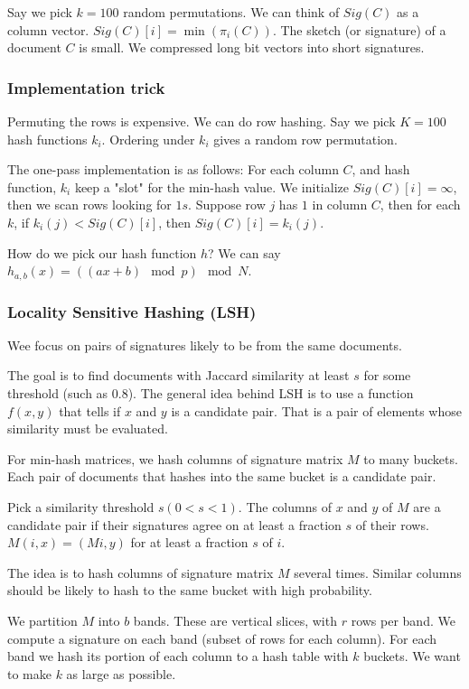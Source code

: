     Say we pick $k = 100$ random permutations. We can think of $Sig(C)$ as a column vector. $Sig(C)[i] = \min(\pi_i(C))$. The sketch (or signature) of a document $C$ is small. We compressed long bit vectors into short signatures. 
    
    \subsubsection{Implementation trick}
        Permuting the rows is expensive. We can do row hashing. Say we pick $K = 100$ hash functions $k_i$. Ordering under $k_i$ gives a random row permutation. 
        
        The one-pass implementation is as follows: For each column $C$, and hash function, $k_i$ keep a "slot" for the min-hash value. We initialize $Sig(C)[i] = \infty$, then we scan rows looking for $1s$. Suppose row $j$ has $1$ in column $C$, then for each $k$, if $k_i(j) < Sig(C)[i]$, then $Sig(C)[i] = k_i(j)$. 
        
        How do we pick our hash function $h$? We can say $h_{a,b}(x) = ((ax+b) \mod p) \mod N$.
    
    \subsubsection{Locality Sensitive Hashing (LSH)}
        Wee focus on pairs of signatures likely to be from the same documents. 
        
        The goal is to find documents with Jaccard similarity at least $s$ for some threshold (such as $0.8$). The general idea behind LSH is to use a function $f(x,y)$ that tells if $x$ and $y$ is a candidate pair. That is a pair of elements whose similarity must be evaluated. 
        
        For min-hash matrices, we hash columns of signature matrix $M$ to many buckets. Each pair of documents that hashes into the same bucket is a candidate pair. 
        
        Pick a similarity threshold $s(0 < s <1)$. The columns of $x$ and $y$ of $M$ are a candidate pair if their signatures agree on at least a fraction $s$ of their rows. $M(i, x) = (Mi, y)$ for at least a fraction $s$ of $i$. 
        
        The idea is to hash columns of signature matrix $M$ several times. Similar columns should be likely to hash to the same bucket with high probability. 
        
        We partition $M$ into $b$ bands. These are vertical slices, with $r$ rows per band. We compute a signature on each band (subset of rows for each column). For each band we hash its portion of each column to a hash table with $k$ buckets. We want to make $k$ as large as possible. 
        
